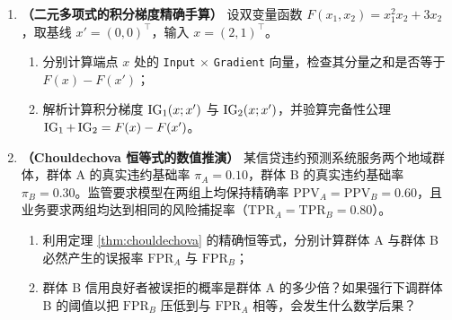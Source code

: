 \begin{enumerate}[label=\textbf{7.4.\arabic*}]
  \item \textbf{（二元多项式的积分梯度精确手算）} 设双变量函数 $F(x_1, x_2) = x_1^2 x_2 + 3 x_2$，取基线 $x' = (0, 0)^\top$，输入 $x = (2, 1)^\top$。
  \begin{enumerate}
    \item 分别计算端点 $x$ 处的 \texttt{Input} $\times$ \texttt{Gradient} 向量，检查其分量之和是否等于 $F(x) - F(x')$；
    \item 解析计算积分梯度 $\operatorname{IG}_1(x; x')$ 与 $\operatorname{IG}_2(x; x')$，并验算完备性公理 $\operatorname{IG}_1 + \operatorname{IG}_2 = F(x) - F(x')$。
  \end{enumerate}

  \item \textbf{（Chouldechova 恒等式的数值推演）} 某信贷违约预测系统服务两个地域群体，群体 A 的真实违约基础率 $\pi_A = 0.10$，群体 B 的真实违约基础率 $\pi_B = 0.30$。监管要求模型在两组上均保持精确率 $\mathrm{PPV}_A = \mathrm{PPV}_B = 0.60$，且业务要求两组均达到相同的风险捕捉率（$\mathrm{TPR}_A = \mathrm{TPR}_B = 0.80$）。
  \begin{enumerate}
    \item 利用定理 \ref{thm:chouldechova} 的精确恒等式，分别计算群体 A 与群体 B 必然产生的误报率 $\mathrm{FPR}_A$ 与 $\mathrm{FPR}_B$；
    \item 群体 B 信用良好者被误拒的概率是群体 A 的多少倍？如果强行下调群体 B 的阈值以把 $\mathrm{FPR}_B$ 压低到与 $\mathrm{FPR}_A$ 相等，会发生什么数学后果？
  \end{enumerate}
\end{enumerate}


